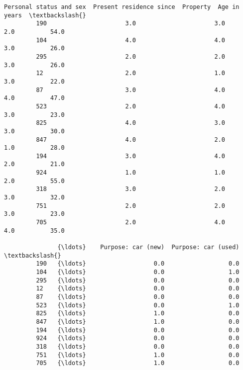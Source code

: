\documentclass[11pt]{article}
\begin{document}
\begin{Verbatim}[commandchars=\\\{\}]
              Personal status and sex  Present residence since  Property  Age in years  \textbackslash{}
         190                      3.0                      3.0       2.0          54.0   
         104                      4.0                      4.0       3.0          26.0   
         295                      2.0                      2.0       3.0          26.0   
         12                       2.0                      1.0       3.0          22.0   
         87                       3.0                      4.0       4.0          47.0   
         523                      2.0                      4.0       3.0          23.0   
         825                      4.0                      3.0       3.0          30.0   
         847                      4.0                      2.0       1.0          28.0   
         194                      3.0                      4.0       2.0          21.0   
         924                      1.0                      1.0       2.0          55.0   
         318                      3.0                      2.0       3.0          32.0   
         751                      2.0                      2.0       3.0          23.0   
         705                      2.0                      4.0       4.0          35.0   
         
               {\ldots}    Purpose: car (new)  Purpose: car (used)  \textbackslash{}
         190   {\ldots}                   0.0                  0.0   
         104   {\ldots}                   0.0                  1.0   
         295   {\ldots}                   0.0                  0.0   
         12    {\ldots}                   0.0                  0.0   
         87    {\ldots}                   0.0                  0.0   
         523   {\ldots}                   0.0                  1.0   
         825   {\ldots}                   1.0                  0.0   
         847   {\ldots}                   1.0                  0.0   
         194   {\ldots}                   0.0                  0.0   
         924   {\ldots}                   0.0                  0.0   
         318   {\ldots}                   0.0                  0.0   
         751   {\ldots}                   1.0                  0.0   
         705   {\ldots}                   1.0                  0.0   
         

\end{Verbatim}
\end{document}
